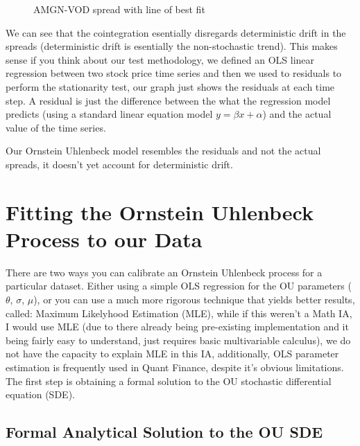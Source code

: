 \documentclass{article}
\begin{document}
\begin{spacing}{2.0}
\begin{figure}[H]
\begin{minipage}{0.48\textwidth}
        \caption{AMGN-VOD spread with line of best fit}
    \end{minipage}
\end{figure}

We can see that the cointegration esentially disregards deterministic drift in the spreads (deterministic drift is esentially the non-stochastic trend). This makes sense if you think
about our test methodology, we defined an OLS linear regression between two stock price time series and then we used to residuals to perform the stationarity test, our graph just
shows the residuals at each time step. A residual is just the difference between the what the regression model predicts (using a standard linear equation model $y = \beta x + \alpha$)
and the actual value of the time series.

Our Ornstein Uhlenbeck model resembles the residuals and not the actual spreads, it doesn't yet account for deterministic drift.

\section{Fitting the Ornstein Uhlenbeck Process to our Data}

There are two ways you can calibrate an Ornstein Uhlenbeck process for a particular dataset. Either using a simple OLS regression for the OU parameters ($\theta$, $\sigma$, $\mu$), or
you can use a much more rigorous technique that yields better results, called: Maximum Likelyhood Estimation (MLE), while if this weren't a Math IA, I would use MLE (due to there already
being pre-existing implementation and it being fairly easy to understand, just requires basic multivariable calculus), we do not have the capacity to explain MLE in this IA, additionally,
OLS parameter estimation is frequently used in Quant Finance, despite it's obvious limitations. The first step is obtaining a formal solution to the OU stochastic differential equation (SDE).

\subsection{Formal Analytical Solution to the OU SDE}


\end{spacing}
\end{document}
